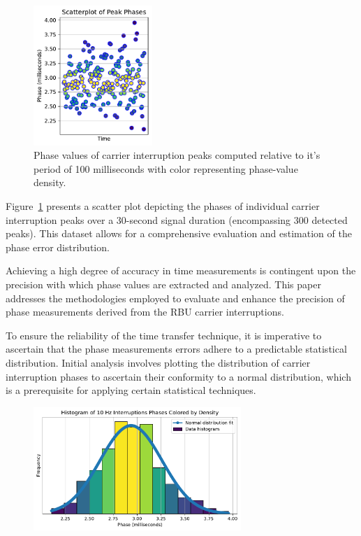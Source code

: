 \documentclass[12pt, a4paper]{extarticle}
\begin{document}
\begin{figure}[H]
    \centering
    \includegraphics[width=0.4\textwidth]{carrier-phases-scatter.pdf}
    \captionsetup{width=0.8\textwidth}
    \caption{Phase values of carrier interruption peaks computed relative to
    it's period of 100 milliseconds with color representing phase-value
    density. }
    \label{fig:carrier-phases-scatter}
\end{figure}

Figure~\ref{fig:carrier-phases-scatter} presents a scatter plot depicting the
phases of individual carrier interruption peaks over a 30-second signal
duration (encompassing 300 detected peaks). This dataset
allows for a comprehensive evaluation and estimation of the phase error distribution.

Achieving a high degree of accuracy in time measurements is contingent upon the
precision with which phase values are extracted and analyzed. This paper
addresses the methodologies employed to evaluate and enhance the precision of
phase measurements derived from the RBU carrier interruptions.

To ensure the reliability of the time transfer technique, it is imperative to
ascertain that the phase measurements errors adhere to a predictable statistical
distribution. Initial analysis involves plotting the distribution of carrier
interruption phases to ascertain their conformity to a normal distribution,
which is a prerequisite for applying certain statistical techniques.

\begin{figure}[h]
    \centering
    \includegraphics[width=0.7\textwidth]{carrier-phases-bins}
    \captionsetup{width=0.8\textwidth}
    \label{fig:carrier-phases-bins}
\end{figure}
\end{document}
